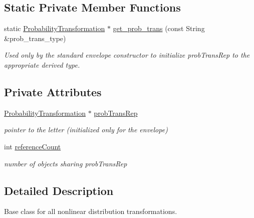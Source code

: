 \subsection*{Static Private Member Functions}
\begin{DoxyCompactItemize}
\item 
static \hyperlink{classPecos_1_1ProbabilityTransformation}{Probability\+Transformation} $\ast$ \hyperlink{classPecos_1_1ProbabilityTransformation_a907d9ae8ff5ee9badbeced2b59b57931}{get\+\_\+prob\+\_\+trans} (const String \&prob\+\_\+trans\+\_\+type)
\begin{DoxyCompactList}\small\item\em Used only by the standard envelope constructor to initialize prob\+Trans\+Rep to the appropriate derived type. \end{DoxyCompactList}\end{DoxyCompactItemize}
\subsection*{Private Attributes}
\begin{DoxyCompactItemize}
\item 
\hyperlink{classPecos_1_1ProbabilityTransformation}{Probability\+Transformation} $\ast$ \hyperlink{classPecos_1_1ProbabilityTransformation_a129cb8b832dae6b12369e7a60e430014}{prob\+Trans\+Rep}\label{classPecos_1_1ProbabilityTransformation_a129cb8b832dae6b12369e7a60e430014}

\begin{DoxyCompactList}\small\item\em pointer to the letter (initialized only for the envelope) \end{DoxyCompactList}\item 
int \hyperlink{classPecos_1_1ProbabilityTransformation_afff0b6144883d3ca09a8d0d3f4776b0f}{reference\+Count}\label{classPecos_1_1ProbabilityTransformation_afff0b6144883d3ca09a8d0d3f4776b0f}

\begin{DoxyCompactList}\small\item\em number of objects sharing prob\+Trans\+Rep \end{DoxyCompactList}\end{DoxyCompactItemize}


\subsection{Detailed Description}
Base class for all nonlinear distribution transformations. 

